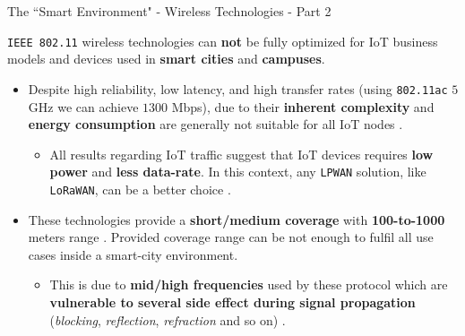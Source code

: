\documentclass[10pt]{beamer}
\begin{document}
\begin{frame}{The ``Smart Environment" - Wireless Technologies - Part 2}

\begin{block}{}
\justifying

\texttt{IEEE 802.11} wireless technologies can \textbf{not} be fully optimized for IoT business models and devices used in \textbf{smart cities} and \textbf{campuses}.
\end{block}

\begin{itemize}
\justifying
\item Despite high reliability, low latency, and high transfer rates (using \texttt{802.11ac} $5$ GHz we can achieve $1300$ Mbps), due to their \textbf{inherent complexity} and \textbf{energy consumption} are generally not suitable for all IoT nodes \cite{IOTCITY}.

\begin{itemize}
\item All results regarding IoT traffic suggest that IoT devices requires \textbf{low power} and \textbf{less data-rate}. In this context, any \texttt{LPWAN} solution, like \texttt{LoRaWAN}, can be a better choice \cite{IOTCITY}.
\end{itemize}

\item These technologies provide a \textbf{short/medium coverage} with \textbf{100-to-1000} meters range \cite{LoRaWAN}. Provided coverage range can be not enough to fulfil all use cases inside a smart-city environment.

\begin{itemize}

\item This is due to \textbf{mid/high frequencies} used by these protocol which are \textbf{vulnerable to several side effect during signal propagation} (\textit{blocking}, \textit{reflection}, \textit{refraction} and so on) \cite{schiller2003mobile}.
\end{itemize}

\end{itemize}



\end{frame} 
\end{document}
